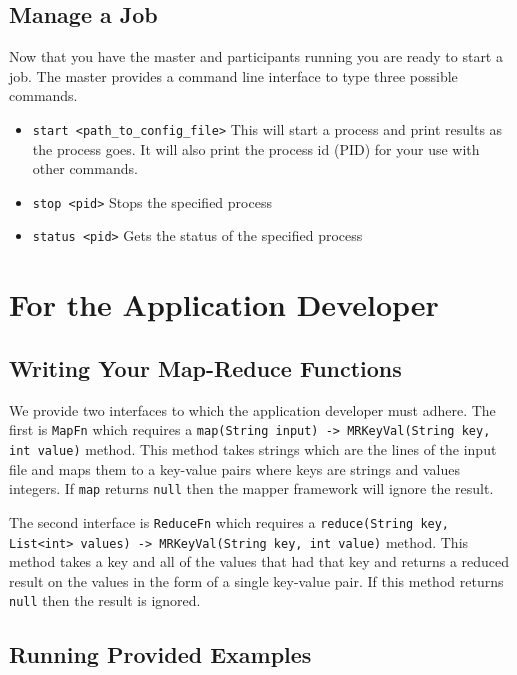 \documentclass[12pt]{article}
\newcommand{\ttt}{\texttt}
\begin{document}
\subsection{Manage a Job}

Now that you have the master and participants running you are ready to start a job. The master provides a command line interface to type three possible commands.

\begin{itemize}
\item
\ttt{start <path\_to\_config\_file>} This will start a process and print results as the process goes. It will also print the process id (PID) for your use with other commands.

\item
\ttt{stop <pid>} Stops the specified process

\item
\ttt{status <pid>} Gets the status of the specified process

\end{itemize}

\section{For the Application Developer}

\subsection{Writing Your Map-Reduce Functions}

We provide two interfaces to which the application developer must adhere. The first is \ttt{MapFn} which requires a \ttt{map(String input) -> MRKeyVal(String key, int value)} method. This method takes strings which are the lines of the input file and maps them to a key-value pairs where keys are strings and values integers. If \ttt{map} returns \ttt{null} then the mapper framework will ignore the result.

The second interface is \ttt{ReduceFn} which requires a \ttt{reduce(String key, List<int> values) -> MRKeyVal(String key, int value)} method. This method takes a key and all of the values that had that key and returns a reduced result on the values in the form of a single key-value pair. If this method returns \ttt{null} then the result is ignored.

\subsection{Running Provided Examples}
\end{document}
